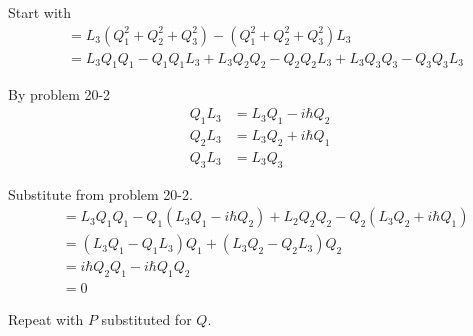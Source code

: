 


\bigskip
Start with
\begin{align*}
[L_3,Q^2]&=L_3(Q_1^2+Q_2^2+Q_3^2)-(Q_1^2+Q_2^2+Q_3^2)L_3
\\
&=L_3Q_1Q_1-Q_1Q_1L_3+L_3Q_2Q_2-Q_2Q_2L_3+L_3Q_3Q_3-Q_3Q_3L_3
\end{align*}

By problem 20-2
\begin{align*}
Q_1L_3&=L_3Q_1-i\hbar Q_2
\\
Q_2L_3&=L_3Q_2+i\hbar Q_1
\\
Q_3L_3&=L_3Q_3
\end{align*}

Substitute from problem 20-2.
\begin{align*}
[L_3,Q^2]
&=L_3Q_1Q_1-Q_1(L_3Q_1-i\hbar Q_2)+L_2Q_2Q_2-Q_2(L_3Q_2+i\hbar Q_1)
\\
&=(L_3Q_1-Q_1L_3)Q_1+(L_3Q_2-Q_2L_3)Q_2
\\
&=i\hbar Q_2Q_1-i\hbar Q_1Q_2
\\
&=0
\end{align*}

Repeat with $P$ substituted for $Q$.


